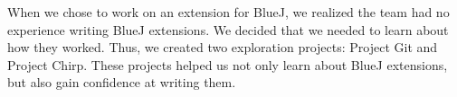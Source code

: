 When we chose to work on an extension for BlueJ,
we realized the team had no experience writing BlueJ extensions.
We decided that we needed to learn about how they worked.
Thus, we created two exploration projects:
Project Git and Project Chirp.
These projects helped us not only learn about BlueJ extensions,
but also gain confidence at writing them.